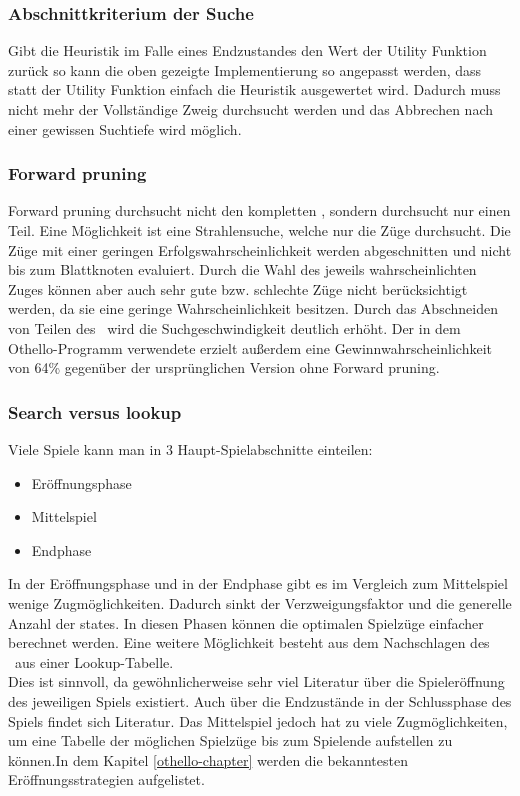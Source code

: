 \subsubsection{Abschnittkriterium der Suche}
Gibt die Heuristik im Falle eines Endzustandes den Wert der Utility Funktion zurück so kann die oben gezeigte Implementierung so angepasst werden, dass statt der Utility Funktion einfach die Heuristik ausgewertet wird. Dadurch muss nicht mehr der Vollständige Zweig durchsucht werden und das Abbrechen nach einer gewissen Suchtiefe wird möglich.
 
\subsubsection{Forward pruning}
Forward pruning durchsucht nicht den kompletten \gtree , sondern durchsucht nur einen Teil. Eine Möglichkeit ist eine Strahlensuche, welche nur die  Züge durchsucht. Die Züge mit einer geringen Erfolgswahrscheinlichkeit werden abgeschnitten und nicht bis zum Blattknoten evaluiert. Durch die Wahl des jeweils wahrscheinlichten Zuges können aber auch sehr gute bzw. schlechte Züge nicht berücksichtigt werden, da sie eine geringe Wahrscheinlichkeit besitzen. Durch das Abschneiden von Teilen des \gtree\ wird die Suchgeschwindigkeit deutlich erhöht. Der in dem Othello-Programm  verwendete  erzielt außerdem eine Gewinnwahrscheinlichkeit von 64\% gegenüber der ursprünglichen Version ohne Forward pruning.
\subsubsection{Search versus lookup}
Viele Spiele kann man in 3 Haupt-Spielabschnitte einteilen:
\begin{itemize}
\item Eröffnungsphase
\item Mittelspiel
\item Endphase
\end{itemize}
In der Eröffnungsphase und in der Endphase gibt es im Vergleich zum Mittelspiel wenige Zugmöglichkeiten. Dadurch sinkt der Verzweigungsfaktor und die generelle Anzahl der states. In diesen Phasen können die optimalen Spielzüge einfacher berechnet werden. Eine weitere Möglichkeit besteht aus dem Nachschlagen des \states\ aus einer Lookup-Tabelle.
\\Dies ist sinnvoll, da gewöhnlicherweise sehr viel Literatur über die Spieleröffnung des jeweiligen Spiels existiert. Auch über die Endzustände in der Schlussphase des Spiels findet sich Literatur. Das Mittelspiel jedoch hat zu viele Zugmöglichkeiten, um eine Tabelle der möglichen Spielzüge bis zum Spielende aufstellen zu können.In dem Kapitel \ref{othello-chapter} werden die bekanntesten Eröffnungsstrategien aufgelistet.
